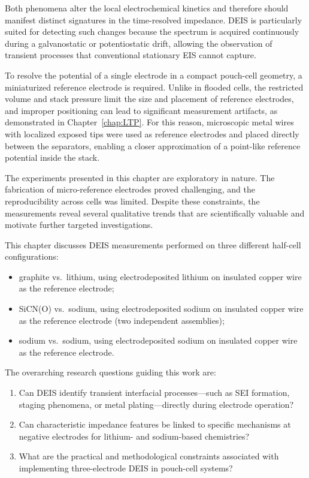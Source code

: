 Both phenomena alter the local electrochemical kinetics and therefore should manifest distinct signatures in the time-resolved impedance.  
DEIS is particularly suited for detecting such changes because the spectrum is acquired continuously during a galvanostatic or potentiostatic drift, allowing the observation of transient processes that conventional stationary EIS cannot capture.

To resolve the potential of a single electrode in a compact pouch-cell geometry, a miniaturized reference electrode is required.  
Unlike in flooded cells, the restricted volume and stack pressure limit the size and placement of reference electrodes, and improper positioning can lead to significant measurement artifacts, as demonstrated in Chapter~\ref{chap:LTP}.  
For this reason, microscopic metal wires with localized exposed tips were used as reference electrodes and placed directly between the separators, enabling a closer approximation of a point-like reference potential inside the stack.

The experiments presented in this chapter are exploratory in nature.  
The fabrication of micro-reference electrodes proved challenging, and the reproducibility across cells was limited.  
Despite these constraints, the measurements reveal several qualitative trends that are scientifically valuable and motivate further targeted investigations.

This chapter discusses DEIS measurements performed on three different half-cell configurations:
\begin{itemize}
    \item graphite vs.\ lithium, using electrodeposited lithium on insulated copper wire as the reference electrode;
    \item SiCN(O) vs.\ sodium, using electrodeposited sodium on insulated copper wire as the reference electrode (two independent assemblies);
    \item sodium vs.\ sodium, using electrodeposited sodium on insulated copper wire as the reference electrode.
\end{itemize}

The overarching research questions guiding this work are:
\begin{enumerate}
    \item Can DEIS identify transient interfacial processes---such as SEI formation, staging phenomena, or metal plating---directly during electrode operation?
    \item Can characteristic impedance features be linked to specific mechanisms at negative electrodes for lithium- and sodium-based chemistries?
    \item What are the practical and methodological constraints associated with implementing three-electrode DEIS in pouch-cell systems?
\end{enumerate}

